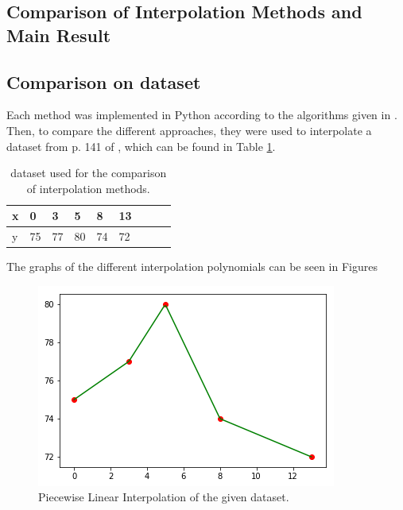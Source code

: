 \documentclass[a4paper,11pt, notitlepage]{article}
\begin{document}
\begin{onehalfspace}
\section{Comparison of Interpolation Methods and Main Result}
\label{sec:Comparison}

\subsection{Comparison on dataset}
\label{subsec:compset}
Each method was implemented in Python according to the algorithms given in \cite{burden1985numerical}. Then, to compare the different approaches, they were used to interpolate a dataset from p. 141 of \cite{burden1985numerical}, which can be found in Table \ref{tab:databook}.

\begin{table}[H]
	\centering
	\begin{tabular}{|l|l|l|l|l|l|l|l|l|}
		\hline
		x & 0  & 3  & 5  & 8  & 13 \\ \hline
		y & 75 & 77 & 80 & 74 & 72 \\ \hline
	\end{tabular}
	\caption{dataset used for the comparison of interpolation methods.}
	\label{tab:databook}
\end{table}

The graphs of the different interpolation polynomials can be seen in Figures 



\begin{figure}[H]
	\centering
	\includegraphics[]{./images/pw-dataset.png}
	\caption{Piecewise Linear Interpolation of the given dataset.}
	\label{fig:pw-dataset}
\end{figure}


\end{onehalfspace}
\end{document}
